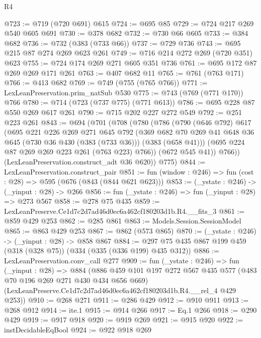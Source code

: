 \begin{lexlean}{R4}
\begin{coremodule}
@723 := @719 (@720 @691) @615
@724 := @695 @85
@729 := @724 @217 @269 @540 @605 @691
@730 := @378 @682
@732 := @730 @66 @605
@733 := @384 @682
@736 := @732 (@383 (@733 @66))
@737 := @729 @736
@743 := @695 @215 @87 @274 @269 @623 @261
@749 := @716 @214 @272 @269 (@720 @351) @623
@755 := @724 @174 @269 @271 @605 @351 @736
@761 := @695 @172 @87 @269 @269 @171 @261
@763 := @407 @682 @11
@765 := @761 (@763 @171)
@766 := @413 @682
@769 := @749 (@755 (@765 @766))
@771 := LexLeanPreservation.prim_natSub @530
@775 := @743 (@769 (@771 @170)) @766
@780 := @714 (@723 (@737 @775) (@771 @613))
@786 := @695 @228 @87 @550 @269 @617 @261
@790 := @715 @202 @227 @272 @549
@792 := @251 @223 @261
@843 := @694
    (@701
      (@708
        (@780
          (@786
            (@790
              (@646 @792)
              @617
              (@695
                @221
                @226
                @269
                @271
                @645
                @792
                (@369
                  @682
                  @70
                  @269
                  @41
                  @648
                  @36
                  @645
                  (@730 @36 @430 (@383 (@733 @36)))
                  (@383 (@658 @41)))
                (@695 @224 @87 @269 @269 @223 @261 (@763 @223) @766))
              (@672 @545 @41))
            @766))
        (LexLeanPreservation.construct_adt @36 @620))
      @775)
@844 := LexLeanPreservation.construct_pair
@851 := fun (window : @246) => fun (cost : @28) => @595 (@676 (@843 (@844 @621 @623)))
@853 := (_ystate : @246) -> (_yinput : @28) -> @266
@856 := fun (_ystate : @246) => fun (_yinput : @28) => @273 @567
@858 := @278 @75 @435
@859 := LexLeanPreserve.Ce1d7c2d7ad46d0ec6a462cf180203d1b.R4.__fits_3
@861 := @859 @429 @253
@862 := @285 @861
@863 := Models.Session.SessionModel
@865 := @863 @429 @253
@867 := @862 (@573 @865)
@870 := (_ystate : @246) -> (_yinput : @28) -> @858 @867
@884 := @297 @75 @435 @867 @199 @459 (@318 (@328 @75)) (@334 (@335 (@336 @199) @435 @312))
@886 := LexLeanPreservation.conv_call @277
@909 := fun (_ystate : @246) =>
  fun (_yinput : @28) =>
  @884
    (@886
      @459
      @101
      @197
      @272
      @567
      @435
      @577
      (@483 @70 @196 @269 @271 @430 @434 @656 @669)
      (LexLeanPreserve.Ce1d7c2d7ad46d0ec6a462cf180203d1b.R4.__rel_4 @429 @253))
@910 := @268 @271
@911 := @286 @429
@912 := @910 @911
@913 := @268 @912
@914 := ite.{1}
@915 := @914 @266
@917 := Eq.{1} @266
@918 := @290 @429
@919 := @917 @918
@920 := @919 @269
@921 := @915 @920
@922 := instDecidableEqBool
@924 := @922 @918 @269

\end{coremodule}
\end{lexlean}
